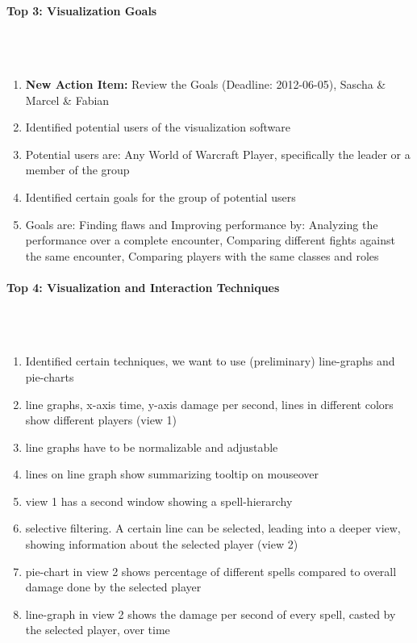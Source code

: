 \documentclass{scrartcl}
\begin{document}
\paragraph{Top 3: Visualization Goals}
\hfill \\ \hfill \\
\begin {enumerate}
\item \textbf{New Action Item:} Review the Goals (Deadline: 2012-06-05), Sascha \& Marcel \& Fabian
\item Identified potential users of the visualization software
\item Potential users are: Any World of Warcraft Player, specifically the leader or a member of the group
\item Identified certain goals for the group of potential users 
\item Goals are: Finding flaws and Improving performance by: Analyzing the performance over a complete encounter, Comparing different fights against the same encounter, Comparing players with the same classes and roles
\end {enumerate}

\paragraph{Top 4: Visualization and Interaction Techniques}
\hfill \\ \hfill \\
\begin {enumerate}
\item Identified certain techniques, we want to use (preliminary) line-graphs and pie-charts
\item line graphs, x-axis time, y-axis damage per second, lines in different colors show different players (view 1)
\item line graphs have to be normalizable and adjustable
\item lines on line graph show summarizing tooltip on mouseover
\item view 1 has a second window showing a spell-hierarchy 
\item selective filtering. A certain line can be selected, leading into a deeper view, showing information about the selected player (view 2)
\item pie-chart in view 2 shows percentage of different spells compared to overall damage done by the selected player
\item line-graph in view 2 shows the damage per second of every spell, casted by the selected player, over time
\end {enumerate}
\end{document}
